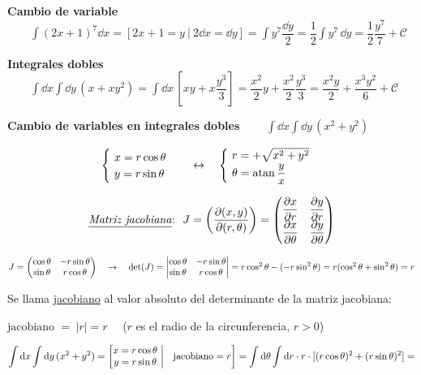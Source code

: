 \textbf{Cambio de variable} $\qquad \displaystyle \int (2x+1)^7 \dd x = \left[ 2x+1=y \ | \  2\dd x = \dd y \right] = \int y^7 \dfrac{\dd y}2=\dfrac 1 2 \int y^7 \, \dd y = \dfrac 1 2 \dfrac {y^7}7 + \mathcal C$

\textbf{Integrales dobles} $\qquad \displaystyle \int \dd x \int \dd y \, (x+xy^2) = \int \dd x \, \left[ xy+x\dfrac {y^3}3  \right]=\dfrac{x^2}{2} y +\dfrac{x^2}2 \dfrac {y^3}{3} =\dfrac{x^2y}{2}+ \dfrac{x^3y^2}{6}+\mathcal C$

\textbf{Cambio de variables en integrales dobles} $\qquad \displaystyle \int \dd x \int \dd y \, (x^2+y^2)$




$$\begin{cases} \ x= r\cos \theta \\ \ y=r\sin \theta \end{cases} \quad \leftrightarrow \quad \begin{cases} \ r=+\sqrt{x^2+y^2}\\ \ \theta = \atan \dfrac y x \end{cases}$$

\vspace{-3mm}
$$\text{\underline{\emph{Matriz jacobiana}}:} \ \ J=\mqty( \displaystyle \pdv{(x,y)}{(r,\theta)} ) = \mqty( \displaystyle \pdv{x}{r} & \displaystyle \pdv{y}{r}  \\ \displaystyle \pdv{x}{\theta} & \displaystyle \pdv{y}{\theta} )$$

\vspace{5mm} 
$J=\mqty(\cos \theta & -r\sin \theta \\ \sin \theta & r\cos \theta) \quad \to \quad \det(J)=\mqty|\cos \theta & -r\sin \theta \\ \sin \theta & r\cos \theta|=r\cos^2\theta-(-r\sin^2 \theta)=r(\cos^2 \theta + \sin^2 \theta)=r$

Se llama \underline{jacobiano} al valor absoluto del determinante de la matriz jacobiana:

$\text{jacobiano } = \ |r| = r\quad $ \textcolor{gris}{($r$ es el radio de la circunferencia, $r>0$)} 

$\displaystyle \int \dd x \int \dd y \, (x^2+y^2) = \left[ \mqty{x=r\cos \theta \ \\ y=r\sin \theta \ } \right| \left. \ \ \text{jacobiano}=r \mqty{ \\ \\ } \right] =
\int \dd \theta \int \dd r \cdot r \cdot [(r\cos \theta)^2+(r\sin \theta)^2]= $

